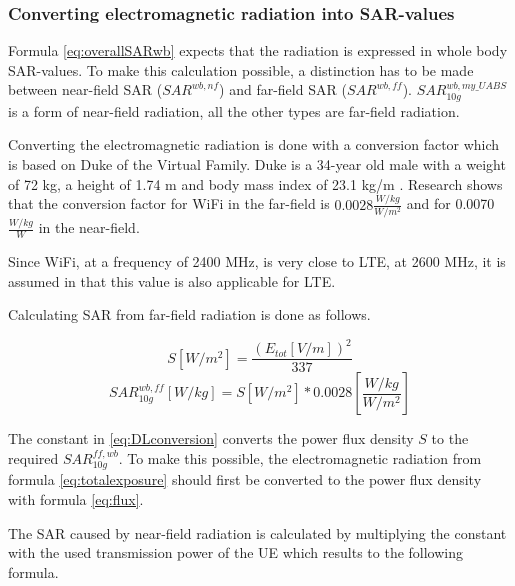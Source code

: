 \documentclass[twocolumn]{phdsymp} %
\begin{document}
\subsubsection{Converting electromagnetic radiation into SAR-values}

Formula \ref{eq:overallSARwb} expects that the radiation is expressed in whole body \gls{SAR}-values.
To make this calculation possible, a distinction has to be made between near-field \gls{SAR}
($SAR^{wb,nf}$) and far-field \gls{SAR} ($SAR^{wb,ff}$). $SAR^{wb,my\_UABS}_{10g}$ is a form of near-field radiation, 
all the other types are far-field radiation.

Converting the electromagnetic radiation is done with a conversion factor which is based 
on Duke of the Virtual Family. Duke is a 34-year old male with a weight of 72 kg, a height of 1.74 m and body
mass index of 23.1 kg/m \cite{J22_plets2015joint}. 
Research shows that the conversion factor for WiFi in the far-field is $0.0028 \frac{W/kg}{W/m^2}$
and for 0.0070 $\frac{W/kg}{W}$ \cite{J22_plets2015joint} in the near-field.

Since WiFi, at a frequency of 2400 MHz,
is very close to \gls{LTE}, at 2600 MHz, it is assumed in \cite{J22_plets2015joint} that this value is also applicable for \gls{LTE}.

Calculating \gls{SAR} from far-field radiation is done as follows.

\begin{equation}
S [W/m^2]= \frac{(E_{tot} [V/m])^2}{337}
\label{eq:flux}
\end{equation}
\begin{equation}
SAR^{wb,ff}_{10g} [W/kg]= S [W/m^2]* 0.0028 \left[\frac{W/kg}{W/m^2}\right]
\label{eq:DLconversion}
\end{equation}

The constant in \ref{eq:DLconversion} converts the \gls{power flux density} $S$ to the required $SAR^{ff,wb}_{10g}$.
To make this possible, the electromagnetic radiation
from formula \ref{eq:totalexposure} should first be converted to the  \gls{power flux density} with formula 
\ref{eq:flux}.

The SAR caused by near-field radiation is calculated by multiplying the constant with the used transmission
power of the \gls{UE} which results to the following formula.
\end{document}
